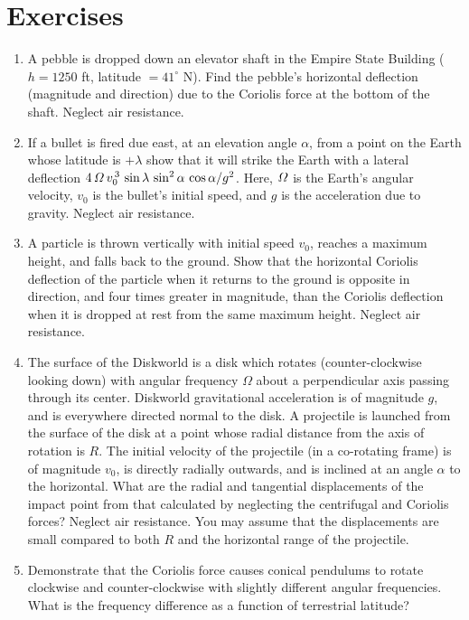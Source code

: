 \section{Exercises}
{\small 
\renewcommand{\theenumi}{7.\arabic{enumi}}
\begin{enumerate}
\item A pebble is dropped down an elevator shaft in the Empire State
Building ($h=1250$ ft, latitude $=41^\circ$ N). Find the pebble's horizontal deflection (magnitude and direction) 
due to the Coriolis force at the bottom of the shaft. Neglect air resistance.
\item If a bullet is fired due east, at an elevation angle $\alpha$, from a point
on the Earth whose latitude is $+\lambda$ show that it will strike the
Earth with a lateral deflection $4\,{\mit\Omega}\,v_0^{\,3}\,\sin\lambda\,\sin^2\alpha\,\cos\alpha/g^2$.
Here, ${\mit\Omega}$ is the Earth's angular velocity, $v_0$ is the bullet's initial speed, and
$g$ is the acceleration due to gravity. Neglect air resistance.
\item A particle is thrown vertically with initial speed $v_0$, reaches
a maximum height, and falls back to the ground. Show that the horizontal Coriolis
deflection of the particle when it returns to the ground is opposite in direction,
and four times greater in magnitude, than the Coriolis deflection when it
is dropped at rest from the same maximum height. Neglect air resistance.
\item The surface of the Diskworld is a disk which
rotates (counter-clockwise looking down) with angular frequency $\Omega$ about a perpendicular axis passing through
its center. Diskworld gravitational acceleration is of magnitude
$g$, and is everywhere directed normal to the disk.
A projectile is launched from the surface of the disk at a point whose radial distance from the axis of rotation is $R$.
The initial velocity of the projectile (in a co-rotating frame) is of magnitude $v_0$,  is directly radially
outwards, and is inclined at an angle  $\alpha$ to the horizontal. 
What are the radial and tangential displacements of the impact point
from that calculated by neglecting the centrifugal and Coriolis forces?
Neglect air resistance. You may assume that the displacements are small
compared to both $R$ and the horizontal range of the projectile. 
\item Demonstrate that the Coriolis force causes conical pendulums to
rotate clockwise and counter-clockwise with slightly different angular frequencies. What
is the frequency difference as a function of terrestrial latitude?

\end{enumerate}}
